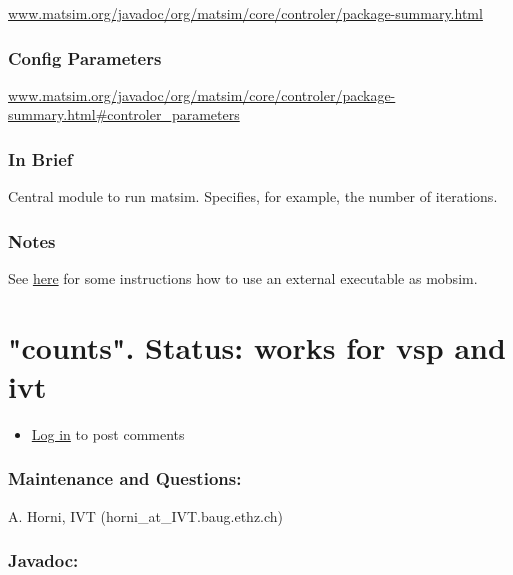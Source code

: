 \documentclass[a4paper,11pt]{report}
\begin{document}
\href{http://www.matsim.org/javadoc/org/matsim/core/controler/package-summary.html}{www.matsim.org/javadoc/org/matsim/core/controler/package-summary.html}



\subsubsection{Config Parameters}

\href{http://www.matsim.org/javadoc/org/matsim/core/controler/package-summary.html#controler_parameters}{www.matsim.org/javadoc/org/matsim/core/controler/package-summary.html\#controler\_parameters}


\subsubsection{\textbf{\textbf{In Brief}}}

Central module to run matsim. Specifies, for example, the number of iterations.



\subsubsection{Notes}

See \href{http://matsim.org/node/398}{here} for some instructions how to use an external executable as mobsim.

\vfill\eject
\section{"counts". Status: works for vsp and ivt}
\begin{itemize}
	\item \href{http://www.matsim.org/user/login?destination=comment/reply/404%23comment-form}{Log in} to post comments
\end{itemize}

\subsubsection{\textbf{Maintenance and Questions:}}

A. Horni, IVT (horni\_at\_IVT.baug.ethz.ch)

\subsubsection{\textbf{\textbf{Javadoc:
\\}}}
\end{document}
